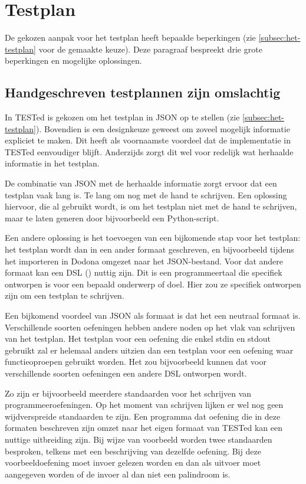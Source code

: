 \section{Testplan}\label{sec:beperkingen-testplan}

De gekozen aanpak voor het testplan heeft bepaalde beperkingen (zie \cref{subsec:het-testplan} voor de gemaakte keuze).
Deze paragraaf bespreekt drie grote beperkingen en mogelijke oplossingen.

\subsection{Handgeschreven testplannen zijn omslachtig}\label{subsec:handgeschreven-testplannen-zijn-omslachtig}

In TESTed is gekozen om het testplan in JSON op te stellen (zie \cref{subsec:het-testplan}).
Bovendien is een designkeuze geweest om zoveel mogelijk informatie expliciet te maken.
Dit heeft als voornaamste voordeel dat de implementatie in TESTed eenvoudiger blijft.
Anderzijds zorgt dit wel voor redelijk wat herhaalde informatie in het testplan.

De combinatie van JSON met de herhaalde informatie zorgt ervoor dat een testplan vaak lang is.
Te lang om nog met de hand te schrijven.
Een oplossing hiervoor, die al gebruikt wordt, is om het testplan niet met de hand te schrijven, maar te laten generen door bijvoorbeeld een Python-script.

Een andere oplossing is het toevoegen van een bijkomende stap voor het testplan: het testplan wordt dan in een ander formaat geschreven, en bijvoorbeeld tijdens het importeren in Dodona omgezet naar het JSON-bestand.
Voor dat andere formaat kan een DSL () nuttig zijn.
Dit is een programmeertaal die specifiek ontworpen is voor een bepaald onderwerp of doel.
Hier zou ze specifiek ontworpen zijn om een testplan te schrijven.

Een bijkomend voordeel van JSON als formaat is dat het een neutraal formaat is.
Verschillende soorten oefeningen hebben andere noden op het vlak van schrijven van het testplan.
Het testplan voor een oefening die enkel stdin en stdout gebruikt zal er helemaal anders uitzien dan een testplan voor een oefening waar functieoproepen gebruikt worden.
Het zou bijvoorbeeld kunnen dat voor verschillende soorten oefeningen een andere DSL ontworpen wordt.

Zo zijn er bijvoorbeeld meerdere standaarden voor het schrijven van programmeeroefeningen.
Op het moment van schrijven lijken er wel nog geen wijdverspreide standaarden te zijn.
Een programma dat oefening die in deze formaten beschreven zijn omzet naar het eigen formaat van TESTed kan een nuttige uitbreiding zijn.
Bij wijze van voorbeeld worden twee standaarden besproken, telkens met een beschrijving van dezelfde oefening.
Bij deze voorbeeldoefening moet invoer gelezen worden en dan als uitvoer moet aangegeven worden of de invoer al dan niet een palindroom is.

